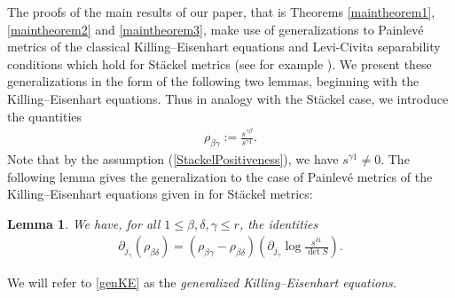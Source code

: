\documentclass[pdftex]{sigma}
\numberwithin{equation}{section}
\newtheorem{Lemma}[Theorem]{Lemma}
\begin{document}
The proofs of the main results of our paper, that is Theorems \ref{maintheorem1}, \ref{maintheorem2} and \ref{maintheorem3}, make use of generalizations to Painlev\'e metrics of the classical Killing--Eisenhart equations and Levi-Civita separability conditions which hold for St\"ackel metrics (see for example \cite{BCR1-2002, BCR2-2002, Eis1934, KaMi1980, KaMi1981, Per1990}). We present these generalizations in the form of the following two lemmas, beginning with the Killing--Eisenhart equations. Thus in analogy with the St\"ackel case, we introduce the quantities
\begin{gather}\label{defrho}
\rho_{\beta \gamma}:=\frac{s^{\gamma \beta}}{s^{\gamma 1}}.
\end{gather}
Note that by the assumption (\ref{StackelPositiveness}), we have $s^{\gamma 1}\neq 0$.
The following lemma gives the generalization to the case of Painlev\'e metrics of the Killing--Eisenhart equations given in \cite{BCR1-2002,BCR2-2002,Eis1934,KaMi1980,KaMi1981} for St\"ackel metrics:
\begin{Lemma} \label{KE}
We have, for all $1\leq \beta, \delta, \gamma \leq r$, the identities
\begin{gather}\label{genKE}
\partial_{j_{\gamma}}(\rho_{ \beta \delta})= (\rho_{\beta \gamma}-\rho_{\beta \delta })\left(\partial_{j_{\gamma}}{\log \frac{s^{\delta 1}}{\det S}}\right).
\end{gather}
\end{Lemma}
We will refer to \eqref{genKE} as the {\emph{generalized Killing--Eisenhart equations.}}
\end{document}
